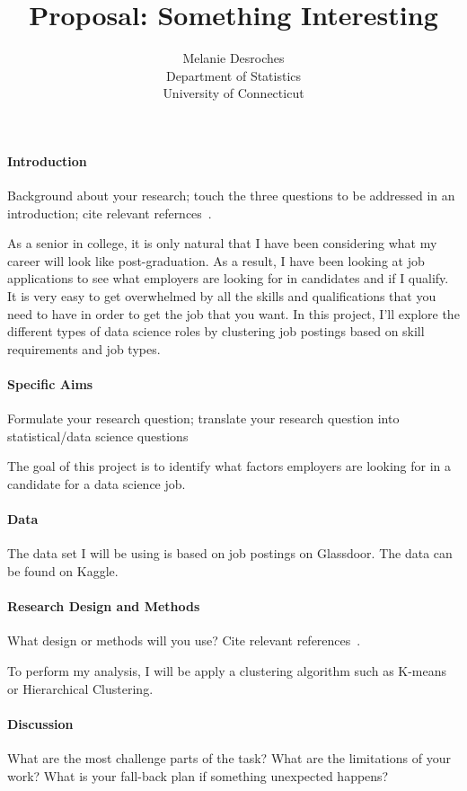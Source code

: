 \documentclass[12pt]{article}
\title{Proposal: Something Interesting}
\author{Melanie Desroches\\
  Department of Statistics\\
  University of Connecticut
}
\begin{document}
\maketitle


\paragraph{Introduction}
Background about your research; touch the three questions to be addressed in an
introduction; cite relevant refernces~\citep[e.g.,][]{dwivedi2017analysis}.

As a senior in college, it is only natural that I have been considering what my career will look like post-graduation.
As a result, I have been looking at job applications to see what employers are looking for in candidates and if I qualify. 
It is very easy to get overwhelmed by all the skills and qualifications that you need to have in order to get the job that 
you want. In this project, I’ll explore the different types of data science roles by clustering job postings based on skill 
requirements and job types.

\paragraph{Specific Aims}
Formulate your research question;
translate your research question into statistical/data science questions

The goal of this project is to identify what factors employers are looking for in a candidate for a data science job.

\paragraph{Data}
The data set I will be using is based on job postings on Glassdoor. The data can be found on Kaggle. 

\lipsum[3]

\paragraph{Research Design and Methods}
What design or methods will you use?
Cite relevant references~\citep[e.g.,][]{wild2004global}.

To perform my analysis, I will be apply a clustering algorithm such as K-means or Hierarchical Clustering. 

\paragraph{Discussion}
What are the most challenge parts of the task?
What are the limitations of your work? What is your fall-back plan if
something unexpected happens?

\lipsum[5]



\end{document}
